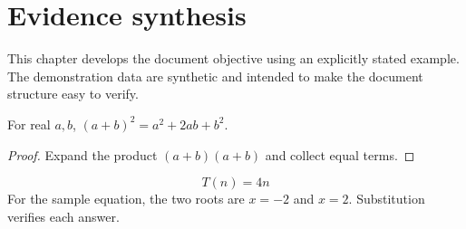 \section{Evidence synthesis}


\label{sec:chapter2}
This chapter develops the document objective using an explicitly stated example. The demonstration data are synthetic and intended to make the document structure easy to verify.

\begin{demotheorem}
For real $a,b$, $(a+b)^2=a^2+2ab+b^2$.
\end{demotheorem}
\begin{proof}
Expand the product $(a+b)(a+b)$ and collect equal terms.
\end{proof}
\[T(n)=4n\]
For the sample equation, the two roots are $x=-2$ and $x=2$. Substitution verifies each answer.
